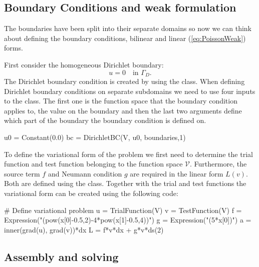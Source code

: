 \subsection{Boundary Conditions and weak formulation}

The boundaries have been split into their separate domains so now we can think about defining the boundary conditions, bilinear and linear (\ref{eq:PoissonWeak}) forms.

First consider the homogeneous Dirichlet boundary:
$$  u = 0 \quad \mbox{in } \Gamma_D.$$
The Dirichlet boundary condition is created by using the   class. When defining Dirichlet boundary conditions on separate subdomains we need to use four inputs to the   class. The first one is the function space that the boundary condition applies to, the value on the boundary and then the last two arguments define which part of the boundary the boundary condition is defined on.
\begin{pythoncode}
u0 = Constant(0.0)
bc = DirichletBC(V, u0, boundaries,1)
\end{pythoncode}

To define the variational form of the problem we first need to determine the trial function   and test function   belonging to the function space $\mathcal{V}$. Furthermore, the source term $f$ and Neumann condition $g$ are required in the linear form $L(v)$. Both are defined using the   class. Together with the trial and test functions the variational form can be created using the following code:
\begin{pythoncode}
# Define variational problem
u = TrialFunction(V)
v = TestFunction(V)
f = Expression("(pow(x[0]-0.5,2)-4*pow(x[1]-0.5,4))")
g = Expression("(5*x[0])")
a = inner(grad(u), grad(v))*dx
L = f*v*dx + g*v*ds(2)
\end{pythoncode}


\subsection{Assembly and solving}

